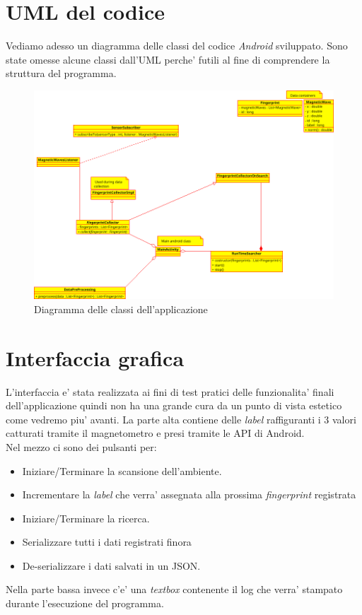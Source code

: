 \section{UML del codice}
Vediamo adesso un diagramma delle classi del codice \textit{Android} sviluppato. Sono state omesse alcune classi dall'UML perche' futili al fine di comprendere la struttura del programma.

\begin{figure}[H]
	\centering
	\includegraphics[width=1\linewidth]{img/class_diagram}
	\caption{Diagramma delle classi dell'applicazione}
	\label{fig:classdiagram}
\end{figure}


\section{Interfaccia grafica}
L'interfaccia e' stata realizzata ai fini di test pratici delle funzionalita' finali dell'applicazione quindi non ha una grande cura da un punto di vista estetico come vedremo piu' avanti.
La parte alta contiene delle \textit{label} raffiguranti i 3 valori catturati tramite il magnetometro e presi tramite le API di Android. \\
Nel mezzo ci sono dei pulsanti per:
\begin{itemize}
	\item Iniziare/Terminare la scansione dell'ambiente.
	\item Incrementare la \textit{label} che verra' assegnata alla prossima \textit{fingerprint} registrata
	\item Iniziare/Terminare la ricerca.
	\item Serializzare tutti i dati registrati finora
	\item De-serializzare i dati salvati in un JSON.
\end{itemize}
Nella parte bassa invece c'e' una \textit{textbox} contenente il log che verra' stampato durante l'esecuzione del programma.

